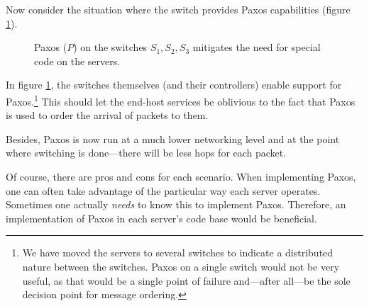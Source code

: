 Now consider the situation where the switch provides Paxos
capabilities (figure \ref{figure:paxos.on.switches}).

\begin{figure}[H]
  \centering
  \caption{Paxos ($P$) on the switches $S_1, S_2, S_3$ mitigates the need for special code on the servers.}
  \label{figure:paxos.on.switches}
\end{figure}

In figure \ref{figure:paxos.on.switches}, the switches themselves (and their
controllers) enable
support for Paxos.\footnote{We have moved the servers to several switches
to indicate a distributed nature between the switches.
Paxos on a single switch would not be very useful, as that would be a single
point of failure and---after all---be the sole decision point for message
ordering.}
%
This should let the end-host services be oblivious to the fact that Paxos is
used to order the arrival of packets to them.

Besides, Paxos is now run at a much lower networking level and at the point where switching is done---there will be less hops
for each packet.

Of course, there are pros and cons for each scenario.
When implementing Paxos, one can often take advantage of
the particular way each server operates. Sometimes one actually
\textit{needs} to know this to implement Paxos.  Therefore, an
implementation of Paxos in each server's code base would be beneficial.

